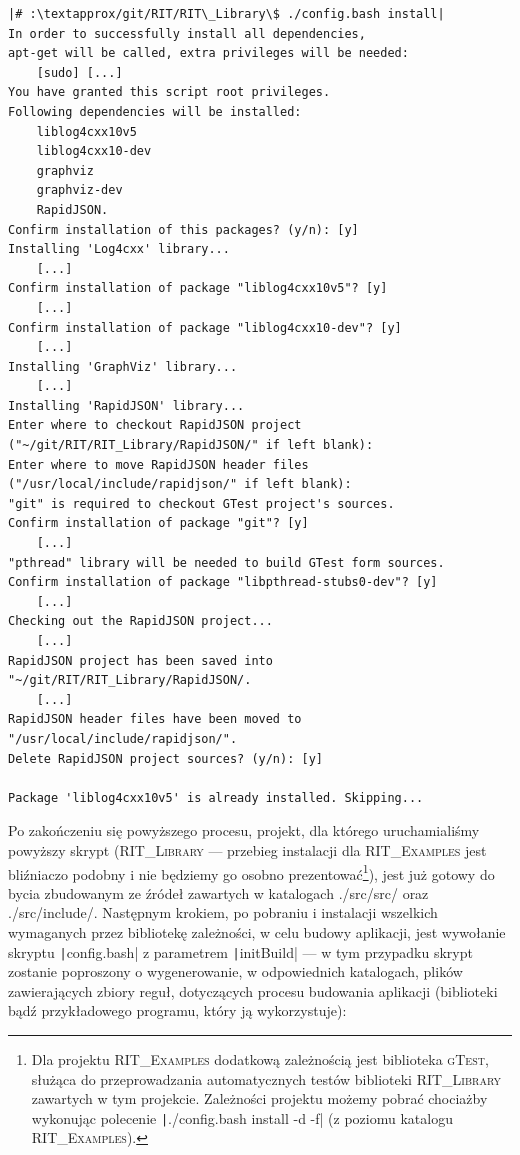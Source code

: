 \begin{verbatim}
|# :\textapprox/git/RIT/RIT\_Library\$ ./config.bash install|
In order to successfully install all dependencies,
apt-get will be called, extra privileges will be needed:
	[sudo] [...]
You have granted this script root privileges.
Following dependencies will be installed:
	liblog4cxx10v5
	liblog4cxx10-dev
	graphviz
	graphviz-dev
	RapidJSON.
Confirm installation of this packages? (y/n): [y]
Installing 'Log4cxx' library...
	[...]
Confirm installation of package "liblog4cxx10v5"? [y]
	[...]
Confirm installation of package "liblog4cxx10-dev"? [y]
	[...]
Installing 'GraphViz' library...
	[...]
Installing 'RapidJSON' library...
Enter where to checkout RapidJSON project ("~/git/RIT/RIT_Library/RapidJSON/" if left blank):
Enter where to move RapidJSON header files ("/usr/local/include/rapidjson/" if left blank): 
"git" is required to checkout GTest project's sources.
Confirm installation of package "git"? [y]
	[...]
"pthread" library will be needed to build GTest form sources.
Confirm installation of package "libpthread-stubs0-dev"? [y]
	[...]
Checking out the RapidJSON project...
	[...]
RapidJSON project has been saved into "~/git/RIT/RIT_Library/RapidJSON/.
	[...]
RapidJSON header files have been moved to "/usr/local/include/rapidjson/".
Delete RapidJSON project sources? (y/n): [y]

Package 'liblog4cxx10v5' is already installed. Skipping...
\end{verbatim}

Po zakończeniu się powyższego procesu, projekt, dla którego uruchamialiśmy powyższy skrypt (\textsc{RIT\_Library} --- przebieg instalacji dla \textsc{RIT\_Examples} jest bliźniaczo podobny i nie będziemy go osobno prezentować\footnote{Dla projektu \textsc{RIT\_Examples} dodatkową zależnością jest biblioteka \textsc{gTest}, służąca do przeprowadzania automatycznych testów biblioteki \textsc{RIT\_Library} zawartych w tym projekcie. Zależności projektu możemy pobrać chociażby wykonując polecenie \texttt|./config.bash install -d -f| (z poziomu katalogu \textsc{RIT\_Examples}).}), jest już gotowy do bycia zbudowanym ze źródeł zawartych w katalogach \textsf{./src/src/} oraz \textsf{./src/include/}. Następnym krokiem, po pobraniu i instalacji wszelkich wymaganych przez bibliotekę zależności, w celu budowy aplikacji, jest wywołanie skryptu \texttt|config.bash| z parametrem \texttt|initBuild| --- w tym przypadku skrypt zostanie poproszony o wygenerowanie, w odpowiednich katalogach, plików zawierających zbiory reguł, dotyczących procesu budowania aplikacji (biblioteki bądź przykładowego programu, który ją wykorzystuje):

